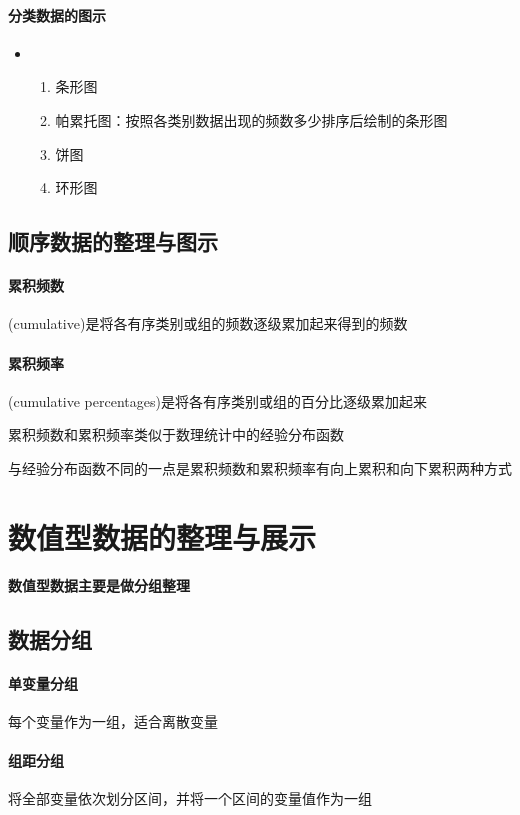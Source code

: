 \documentclass[UTF8,10pt]{book}
\begin{document}
        \paragraph{分类数据的图示} 
            \begin{itemize}
                \item [] {
                    \begin{enumerate}
                        \item 条形图
                        \item 帕累托图：按照各类别数据出现的频数多少排序后绘制的条形图
                        \item 饼图
                        \item 环形图
                    \end{enumerate}
                }
            \end{itemize}
    \subsection{顺序数据的整理与图示}
            \paragraph{累积频数} (cumulative)是将各有序类别或组的频数逐级累加起来得到的频数
            \paragraph{累积频率} (cumulative percentages)是将各有序类别或组的百分比逐级累加起来
                
                累积频数和累积频率类似于数理统计中的经验分布函数

                与经验分布函数不同的一点是累积频数和累积频率有向上累积和向下累积两种方式


    \section{数值型数据的整理与展示}
        \textbf{数值型数据主要是做分组整理}
    \subsection{数据分组}
            \paragraph{单变量分组} 每个变量作为一组，适合离散变量
            \paragraph{组距分组} 将全部变量依次划分区间，并将一个区间的变量值作为一组
\end{document}
